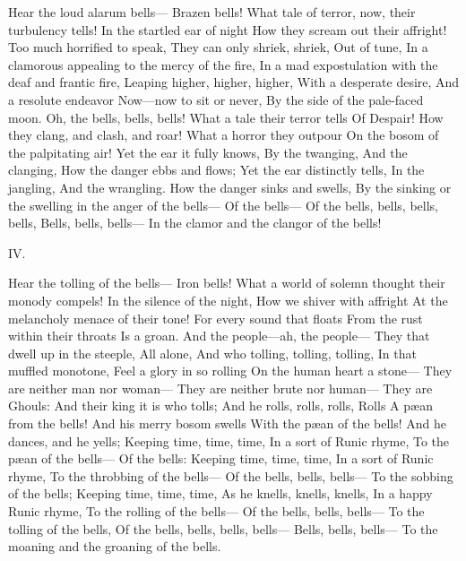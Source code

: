 \documentclass[fontsize=9, a5paper]{scrbook}
\begin{document}
\begin{poem}
\begin{stanza}
         Hear the loud alarum bells—
                 Brazen bells!
What tale of terror, now, their turbulency tells!
       In the startled ear of night
       How they scream out their affright!
         Too much horrified to speak,
         They can only shriek, shriek,
                  Out of tune,
In a clamorous appealing to the mercy of the fire,
In a mad expostulation with the deaf and frantic fire,
            Leaping higher, higher, higher,
            With a desperate desire,
         And a resolute endeavor
         Now—now to sit or never,
       By the side of the pale-faced moon.
            Oh, the bells, bells, bells!
            What a tale their terror tells
                  Of Despair!
       How they clang, and clash, and roar!
       What a horror they outpour
On the bosom of the palpitating air!
       Yet the ear it fully knows,
            By the twanging,
            And the clanging,
         How the danger ebbs and flows;
       Yet the ear distinctly tells,
            In the jangling,
            And the wrangling.
       How the danger sinks and swells,
By the sinking or the swelling in the anger of the bells—
             Of the bells—
     Of the bells, bells, bells, bells,
            Bells, bells, bells—
 In the clamor and the clangor of the bells!
\end{stanza}
\pagebreak
\begin{stanza}
IV.

          Hear the tolling of the bells—
                 Iron bells!
What a world of solemn thought their monody compels!
        In the silence of the night,
        How we shiver with affright
  At the melancholy menace of their tone!
        For every sound that floats
        From the rust within their throats
                 Is a groan.
        And the people—ah, the people—
       They that dwell up in the steeple,
                 All alone,
        And who tolling, tolling, tolling,
          In that muffled monotone,
         Feel a glory in so rolling
          On the human heart a stone—
     They are neither man nor woman—
     They are neither brute nor human—
              They are Ghouls:
        And their king it is who tolls;
        And he rolls, rolls, rolls,
                    Rolls
             A pæan from the bells!
          And his merry bosom swells
             With the pæan of the bells!
          And he dances, and he yells;
          Keeping time, time, time,
          In a sort of Runic rhyme,
             To the pæan of the bells—
               Of the bells:
          Keeping time, time, time,
          In a sort of Runic rhyme,
            To the throbbing of the bells—
          Of the bells, bells, bells—
            To the sobbing of the bells;
          Keeping time, time, time,
            As he knells, knells, knells,
          In a happy Runic rhyme,
            To the rolling of the bells—
          Of the bells, bells, bells—
            To the tolling of the bells,
      Of the bells, bells, bells, bells—
              Bells, bells, bells—
  To the moaning and the groaning of the bells.
\end{stanza}
\end{poem}
\end{document}
